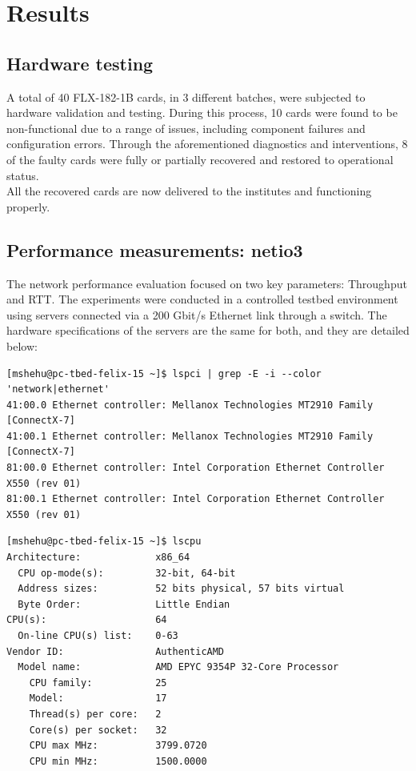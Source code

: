 \chapter{Results}

\section{Hardware testing}

A total of 40 FLX-182-1B cards, in 3 different batches, were subjected to hardware validation and testing. During this process, 10 cards were found to be non-functional due to a range of issues, including component failures and configuration errors. Through the aforementioned diagnostics and interventions, 8 of the faulty cards were fully or partially recovered and restored to operational status.\\
All the recovered cards are now delivered to the institutes and functioning properly.

\section{Performance measurements: netio3}
\label{sec:netio3-perf}
The network performance evaluation focused on two key parameters: Throughput and \ac{RTT}. The experiments were conducted in a controlled testbed environment using servers connected via a 200 Gbit/s Ethernet link through a switch. The hardware specifications of the servers are the same for both, and they are detailed below:


\begin{lstlisting}[caption={Network interface information}, label={lst:network}]
[mshehu@pc-tbed-felix-15 ~]$ lspci | grep -E -i --color 'network|ethernet'
41:00.0 Ethernet controller: Mellanox Technologies MT2910 Family [ConnectX-7]
41:00.1 Ethernet controller: Mellanox Technologies MT2910 Family [ConnectX-7]
81:00.0 Ethernet controller: Intel Corporation Ethernet Controller X550 (rev 01)
81:00.1 Ethernet controller: Intel Corporation Ethernet Controller X550 (rev 01)
\end{lstlisting}

\begin{lstlisting}[caption={CPU information}, label={lst:cpu}, float=htbp]
[mshehu@pc-tbed-felix-15 ~]$ lscpu
Architecture:             x86_64
  CPU op-mode(s):         32-bit, 64-bit
  Address sizes:          52 bits physical, 57 bits virtual
  Byte Order:             Little Endian
CPU(s):                   64
  On-line CPU(s) list:    0-63
Vendor ID:                AuthenticAMD
  Model name:             AMD EPYC 9354P 32-Core Processor
    CPU family:           25
    Model:                17
    Thread(s) per core:   2
    Core(s) per socket:   32
    CPU max MHz:          3799.0720
    CPU min MHz:          1500.0000
\end{lstlisting}

